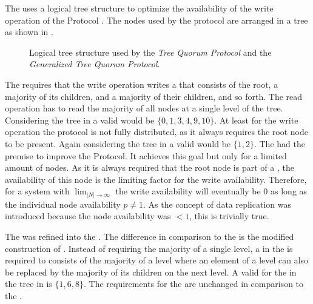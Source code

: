 \documentclass[conference]{IEEEtran}
\begin{document}
The  uses a logical tree structure to optimize the
availability of the write operation of the  Protocol \cite{AA90:tqp}.
The nodes used by the protocol are arranged in a tree as shown in
.
\begin{figure}
		
	\caption{Logical tree structure used by the \emph{Tree Quorum Protocol} and
	the \emph{Generalized Tree Quorum Protocol}.}
\label{fig:tree}
\end{figure}
The  requires that the write operation writes a  that consists of
the root, a majority of its children, and a majority of their children, and so
forth.
The read operation has to read the majority of all nodes at a single level of
the tree.
Considering the tree in  a valid  would be
\(\{0,1,3,4,9,10\}\).
At least for the write operation the protocol is not fully distributed, as it
always requires the root node to be present.
Again considering the tree in  a valid  would be
\(\{1,2\}\).
The  had the premise to improve the  Protocol.
It achieves this goal but only for a limited amount of nodes.
As it is always required that the root node is part of a , the
availability of this node is the limiting factor for the write availability.
Therefore, for a system with \(\lim_{|N| \to \infty}\) the write
availability will eventually be \(0\) as long as the individual node
availability \(p \ne 1\).
As the concept of data replication was introduced because the node
availability was \(< 1\), this is trivially true.

The  was refined into the  \cite{AA92:gtqp}.
The difference in comparison to the  is the modified construction of
.
Instead of requiring the majority of a single level, a  in the
 is required to consists of the majority of a level where an element
of a level can also be replaced by the majority of its children on the next
level.
A valid  for the  in the tree in  is \(\{1,6,8\}\).
The requirements for the  are unchanged in comparison to the .
\end{document}
